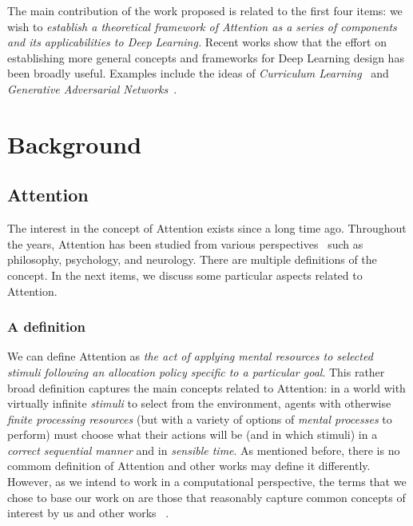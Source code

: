 \documentclass[12pt]{article}
\begin{document}
The main contribution of the work proposed is related to the first four items:
we wish to
\emph{establish a theoretical framework of Attention as a series of components
    and its applicabilities to Deep Learning.}
Recent works show that the effort on establishing more general concepts and frameworks for
Deep Learning design has been broadly useful.
Examples include the ideas of \emph{Curriculum Learning}~\cite{ref:curriculum}
and \emph{Generative Adversarial Networks}~\cite{ref:gans}.

\newpage
\section{Background}
\subsection{Attention}
\label{attention}
The interest in the concept of Attention exists since a long time ago.
Throughout the years, Attention has been studied
from various perspectives~\cite{ref:esther-thesis}
such as philosophy, psychology, and neurology.
There are multiple definitions of the concept.
In the next items, we discuss some particular aspects related to Attention.

\subsubsection{A definition}
\label{sec:attdef}
We can define Attention as
\emph{the act of applying mental resources to selected stimuli following an allocation policy specific to
    a particular goal}.
This rather broad definition captures the main concepts related to Attention:
in a world with virtually infinite
\emph{stimuli} to select from the environment, agents with otherwise \emph{finite processing
resources} (but with a variety of options of \emph{mental processes} to perform) must choose what their
actions will be (and in which stimuli) in a \emph{correct sequential manner} and in \emph{sensible time}.
As mentioned before, there is no commom definition of Attention and other works may define it differently. However, as we intend to work in a computational perspective, the terms that we chose to base our work on are those that reasonably capture common concepts of interest by us and other works ~\cite{ref:helgason}.
\end{document}
